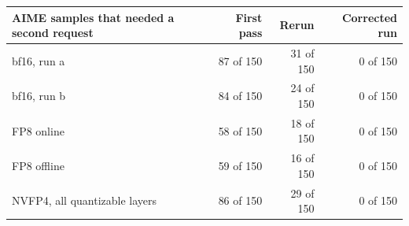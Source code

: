 \begin{tabular}{@{}lrrr@{}}
\toprule
AIME samples that needed a second request & First pass & Rerun & Corrected run \\
\midrule
bf16, run a & 87 of 150 & 31 of 150 & 0 of 150 \\
bf16, run b & 84 of 150 & 24 of 150 & 0 of 150 \\
FP8 online & 58 of 150 & 18 of 150 & 0 of 150 \\
FP8 offline & 59 of 150 & 16 of 150 & 0 of 150 \\
NVFP4, all quantizable layers & 86 of 150 & 29 of 150 & 0 of 150 \\
\bottomrule
\end{tabular}
